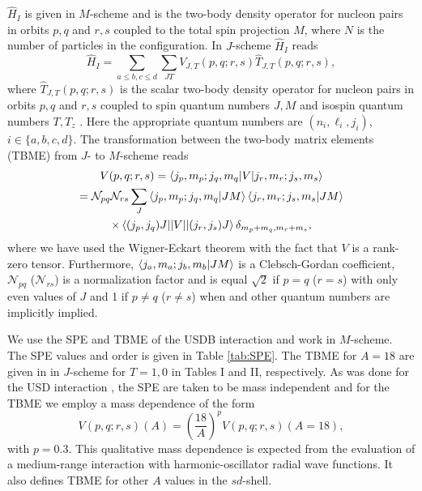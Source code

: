 \documentclass[aps,prl,reprint,groupedaddress]{revtex4-1}  %
\begin{document}
$\hat H_I$ is given in $M$-scheme and is the two-body density operator for nucleon pairs in orbits $p,q$ and $r,s$ coupled to the total spin projection $M$, where $N$ is the number of particles in the configuration. In $J$-scheme $\hat H_I$ reads 
\begin{equation}
	\hat H_I =  \sum_{a\leq b,c \leq d} \sum_{JT} V_{J,T}(p,q;r,s) \hat T_{J,T}(p,q;r,s),
\end{equation}
where $\hat T_{J,T}(p,q;r,s)$ is the scalar two-body density operator for nucleon pairs in orbits $p,q$ and $r,s$ coupled to spin quantum numbers $J,M$ and isospin quantum numbers $T,T_z$ \cite{Brown2006}. Here the appropriate quantum numbers are $(n_i,\ell_i,j_i)$, $i \in \{a,b,c,d\}$. The transformation between the two-body matrix elements (TBME) from $J$- to $M$-scheme reads
\begin{multline}
	V(p,q;r,s)  =  \braket{j_{p},m_{p};j_{q},m_{q}|V|j_{r},m_{r};j_{s},m_{s}} \\ 
			    =  \mathcal{N}_{pq} \mathcal{N}_{rs} \sum_{J} \braket{j_{p},m_{p};j_{q},m_{q}|JM} \braket{j_{r},m_{r};j_{s},m_{s}|JM} \\
			   	\times \braket{(j_{p},j_{q})J||V||(j_{r},j_{s})J} \delta_{m_p+m_q,m_r+m_s},
\end{multline}
where we have used the Wigner-Eckart theorem with the fact that $ V $ is a rank-zero tensor. Furthermore, $\braket{j_{a},m_{a};j_{b},m_{b}|JM}$ is a Clebsch-Gordan coefficient, $ \mathcal{N}_{pq} $ ($ \mathcal{N}_{rs} $) is a normalization factor and is equal $ \sqrt{2} $ if $ p=q $ ($ r=s $) with only even values of $ J $ and 1 if $ p \not=q $ ($ r \not=s $) when and other quantum numbers are implicitly implied.

We use the SPE and TBME of the USDB interaction \cite{Brown2006} and work in $M$-scheme. The SPE values and order is given in Table \ref{tab:SPE}. The TBME for $A=18$ are given in \cite{Brown2006} in $J$-scheme for $T=1,0$ in Tables I and II, respectively. As was done for the USD interaction \cite{Wildenthal1984}, the SPE are taken to be mass independent and for the TBME we employ a mass dependence of the form
\begin{equation}
	V(p,q;r,s)(A) = \left( \frac{18}{A} \right)^p V(p,q;r,s)(A=18),
\end{equation}
with $p=0.3$. This qualitative mass dependence is expected from the evaluation of a medium-range interaction with harmonic-oscillator radial wave functions. It also defines TBME for other $A$ values in the $sd$-shell.
\end{document}

